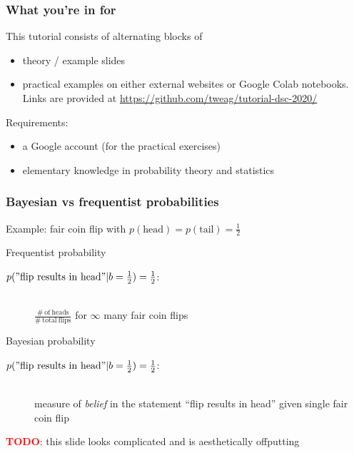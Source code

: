 \documentclass[t]{beamer}
\newcommand{\todo}{\textcolor{red}{\textbf{TODO}}}
\begin{document}
\begin{frame}
  \frametitle{What you're in for}
  This tutorial consists of alternating blocks of
  \begin{itemize}
  \item theory / example slides
  \item practical examples on either external websites or Google Colab notebooks. Links are provided at {\centering \url{https://github.com/tweag/tutorial-dsc-2020/}}
  \end{itemize}

  Requirements:
  \begin{itemize}
  \item a Google account (for the practical exercises)
  \item elementary knowledge in probability theory and statistics
  \end{itemize}
\end{frame}


\begin{frame}
  \frametitle{Bayesian vs frequentist probabilities}
  Example: fair coin flip with $p(\mathrm{head}) = p(\mathrm{tail}) = \frac{1}{2}$
  \begin{block}{Frequentist probability}
    \begin{description}
    \item[$p(\mathrm{"flip\ results\ in\ head"}|b=\frac{1}{2})=\frac{1}{2}$:] \hfill \\ $\frac{\mathrm{\# \ of \ heads}}{\mathrm{\# \ total \ flips}}$ for $\infty$ many fair coin flips
    \end{description}
  \end{block}
  \begin{block}{Bayesian probability}
    \begin{description}
    \item[$p(\mathrm{"flip\ results\ in\ head"}|b=\frac{1}{2})=\frac{1}{2}$:] \hfill \\ measure of \textit{belief} in the statement ``flip results in head'' given single fair coin flip
    \end{description}
  \end{block}
  \todo: this slide looks complicated and is aesthetically offputting
\end{frame}
\end{document}
